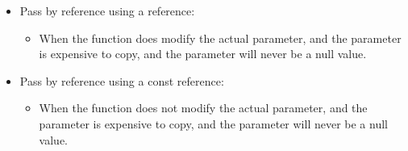 \begin{itemize}
\begin{itemize}
            \item Pass by reference using a reference:
                \begin{itemize}
                    \item When the function does modify the actual parameter, and the parameter is expensive to copy, and the parameter will never be a null value.
                \end{itemize}
            
            \item Pass by reference using a const reference:
                \begin{itemize}
                    \item When the function does not modify the actual parameter, and the parameter is expensive to copy, and the parameter will never be a null value.
                \end{itemize}
        \end{itemize}
\end{itemize}
